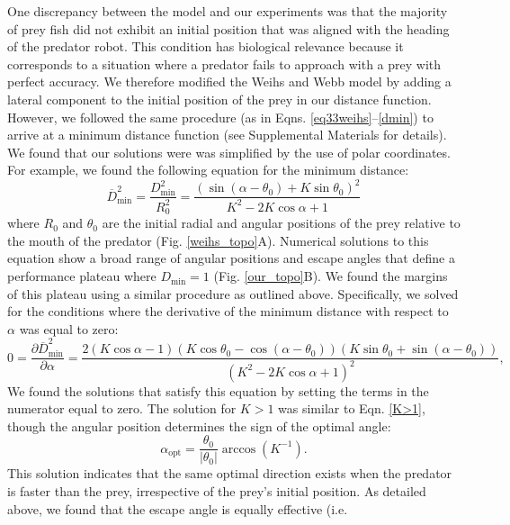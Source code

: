 \documentclass[12pt]{article}
\def\ds{\displaystyle}
\def\d{\partial}
\newcommand{\ol}{\overline}
\begin{document}
One discrepancy between the model and our experiments was that the majority of
prey fish did not exhibit an initial position that was aligned with the heading
of the predator robot. This condition has biological relevance because it
corresponds to a situation where a predator fails to approach with a prey with
perfect accuracy. We therefore modified the Weihs and Webb model by adding a
lateral component to the initial position of the prey in our distance function.
However, we followed the same procedure (as in Eqns.
\ref{eq33weihs}--\ref{dmin}) to arrive at a minimum distance function (see
Supplemental Materials for details). We found that our solutions were was
simplified by the use of polar coordinates. For example, we found the following
equation for the minimum distance:
%
\begin{equation}
\ol{D}^2_{\text{min}}= \ds\frac{{D}^2_{\text{min}}}{R_0^2 }=
\ds\frac{\left ( \sin(\alpha - \theta_0) + K \sin \theta_0 \right )^2}{K^2-2 K
\cos \alpha +1} 
\label{Dmin_polar}
\end{equation}
%
where $R_0$ and $\theta_0$ are the initial radial and angular positions of the
prey relative to the mouth of the predator (Fig. \ref{weihs_topo}A). Numerical
solutions to this equation show a broad range of angular positions and escape
angles that define a performance plateau where $D_{\text{min}}=1$ (Fig.
\ref{our_topo}B). We found the margins of this plateau using a similar
procedure as outlined above. Specifically, we solved for the conditions where
the derivative of the minimum distance with respect to $\alpha$ was equal to
zero:
%
\begin{equation}
0 = \frac{\d \ol{D}^2_{\text{min}}}{\d \alpha} = 
\frac{2(K \cos \alpha - 1)(K\cos \theta_0 - \cos(\alpha - \theta_0))(K\sin
\theta_0 + \sin(\alpha -\theta_0))}
{(K^2 - 2K \cos \alpha + 1)^2},
\label{DminDalpha}
\end{equation} 
%
We found the solutions that satisfy this equation by setting the terms in the
numerator equal to zero. The solution for $K>1$ was similar to Eqn. \ref{K>1},
though the angular position determines the sign of the optimal angle: 
%
\begin{equation}
\alpha_{\text{opt}} = \frac{\theta_0}{|\theta_0|}  \arccos(K^{-1}).
\label{DminDalpha}
\end{equation} 
%
This solution indicates that the same optimal direction exists when the
predator is faster than the prey, irrespective of the prey's initial position.
As detailed above, we found that the escape angle is equally effective (i.e.
\end{document}
